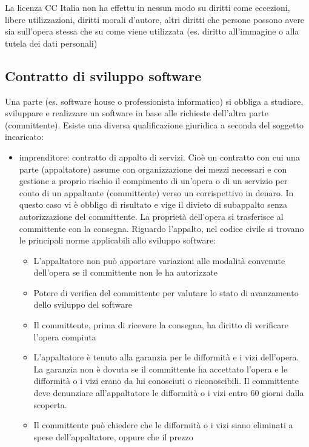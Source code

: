 La licenza CC Italia non ha effettu in nessun modo su diritti come eccezioni, libere utilizzazioni, diritti morali d'autore, altri diritti che persone possono avere sia sull'opera stessa
che su come viene utilizzata (es. diritto all'immagine o alla tutela dei dati personali)

\subsection{Contratto di sviluppo software}
Una parte (es. software house o professionista informatico) si obbliga a studiare, sviluppare e realizzare un software in base alle richieste dell'altra parte (committente).\newline
Esiste una diversa qualificazione giuridica a seconda del soggetto incaricato:
\begin{itemize}
    \item imprenditore: contratto di appalto di servizi. Cioè un contratto con cui una parte (appaltatore) assume con organizzazione dei mezzi
    necessari e con gestione a proprio rischio il compimento di un'opera o di un servizio per conto di un appaltante (committente) verso un corrispettivo
    in denaro. In questo caso vi è obbligo di risultato e vige il divieto di subappalto senza autorizzazione del committente.\newline
    La proprietà dell'opera si trasferisce al committente con la consegna.\newline
    Riguardo l'appalto, nel codice civile si trovano le principali norme applicabili allo sviluppo software:
    \begin{itemize}
        \item L'appaltatore non può apportare variazioni alle modalità convenute dell'opera se il committente non le ha autorizzate
        \item Potere di verifica del committente per valutare lo stato di avanzamento dello sviluppo del software
        \item Il committente, prima di ricevere la consegna, ha diritto di verificare l'opera compiuta
        \item L'appaltatore è tenuto alla garanzia per le difformità e i vizi dell'opera. La garanzia non è dovuta se il committente ha
        accettato l'opera e le difformità o i vizi erano da lui conosciuti o riconoscibili. Il committente deve denunziare all'appaltatore le
        difformità o i vizi entro 60 giorni dalla scoperta.
        \item Il committente può chiedere che le difformità o i vizi siano eliminati a spese dell'appaltatore, oppure che il prezzo

\end{itemize}
\end{itemize}
